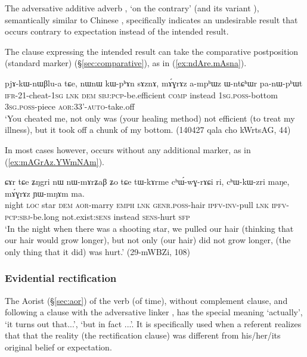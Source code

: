 The adversative additive adverb , `on the contrary' (and its variant ), semantically similar to Chinese , specifically indicates an undesirable result that occurs contrary to expectation instead of the intended result.

The clause expressing the intended result can take the comparative postposition (standard marker)  (§\ref{sec:comparative}), as in (\ref{ex:ndAre.mAsna}).

\begin{exe}
\ex \label{ex:sAznA.mAGrAZ}
\gll pjɤ-kɯ-nɯβlu-a tɕe, nɯnɯ kɯ-pʰɤn sɤznɤ, mɤ́ɣrɤz a-mpʰɯz ɯ-ntɕʰɯr pa-nɯ-pʰɯt \\
\textsc{ifr}-2\fl{}1-cheat-\textsc{1sg} \textsc{lnk} \textsc{dem} \textsc{sbj}:\textsc{pcp}-be.efficient \textsc{comp} instead \textsc{1sg}.\textsc{poss}-bottom \textsc{3sg}.\textsc{poss}-piece \textsc{aor}:3\fl{}3'-\textsc{auto}-take.off \\
\glt `You cheated me, not only was (your healing method) not efficient (to treat my illness), but it took off a chunk of my bottom. (140427 qala cho kWrtsAG, 44)
\end{exe} 

In most cases however,  occurs without any additional marker, as in (\ref{ex:mAGrAz.YWmNAm}).

\begin{exe}
\ex \label{ex:mAGrAz.YWmNAm}
\gll  ɕɤr tɕe ʑŋgri nɯ nɯ-mɤrʑaβ ʑo tɕe tɯ-kɤrme cʰɯ́-wɣ-rɤɕi ri, cʰɯ-kɯ-zri maŋe, mɤ́ɣrɤz ɲɯ-mŋɤm ma. \\
night \textsc{loc} star \textsc{dem} \textsc{aor}-marry \textsc{emph} \textsc{lnk} \textsc{genr}.\textsc{poss}-hair \textsc{ipfv}-\textsc{inv}-pull \textsc{lnk} \textsc{ipfv}-\textsc{pcp}:\textsc{sbj}-be.long not.exist:\textsc{sens} instead \textsc{sens}-hurt \textsc{sfp} \\
\glt `In the night when there was a shooting star, we pulled our hair (thinking that our hair would grow longer), but not only (our hair) did not grow longer, (the only thing that it did) was hurt.' (29-mWBZi, 108)
\end{exe} 

 \subsubsection{Evidential rectification} \label{sec:evd.rectification.clauses}
 The Aorist  (§\ref{sec:aor}) of the verb  (of time),  without complement clause, and following a clause with the adversative linker , has the special meaning `actually', `it turns out that...', `but in fact ...'. It is specifically used when a referent realizes that that the reality (the rectification clause) was different from his/her/its original belief or expectation. 

